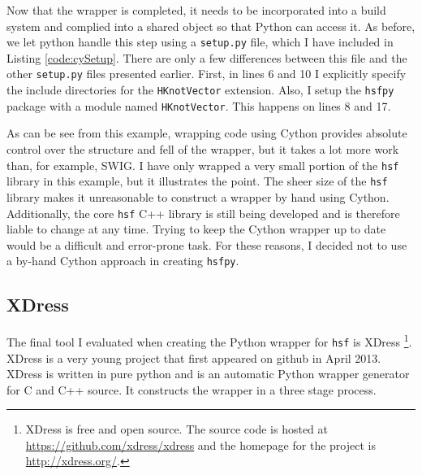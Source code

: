     Now that the wrapper is completed, it needs to be incorporated into a build system and complied into a shared object so that Python can access it. As before, we let python handle this step using a \texttt{setup.py} file, which I have included in Listing \ref{code:cySetup}. There are only a few differences between this file and the other \texttt{setup.py} files presented earlier. First, in lines 6 and 10 I explicitly specify the include directories for the \texttt{HKnotVector} extension. Also, I setup the \texttt{hsfpy} package with a module named \texttt{HKnotVector}. This happens on lines 8 and 17.

    
    \mainstretch{}

    As can be see from this example, wrapping code using Cython provides absolute control over the structure and fell of the wrapper, but it takes a lot more work than, for example, SWIG. I have only wrapped a very small portion of the \texttt{hsf} library in this example, but it illustrates the point. The sheer size of the \texttt{hsf} library makes it unreasonable to construct a wrapper by hand using Cython. Additionally, the core \texttt{hsf} C++ library is still being developed and is therefore liable to change at any time. Trying to keep the Cython wrapper up to date would be a difficult and error-prone task. For these reasons, I decided not to use a by-hand Cython approach in creating \texttt{hsfpy}.

\subsection{XDress} \label{sub:XDress}

  The final tool I evaluated when creating the Python wrapper for \texttt{hsf} is XDress \footnote{XDress is free and open source. The source code is hosted at \url{https://github.com/xdress/xdress} and the homepage for the project is \url{http://xdress.org/}.}. XDress is a very young project that first appeared on github in April 2013. XDress is written in pure python and is an automatic Python wrapper generator for C and C++ source. It constructs the wrapper in a three stage process.

